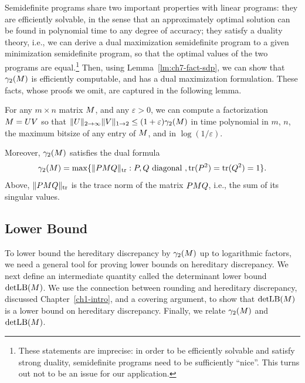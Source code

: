 Semidefinite programs share two important properties with linear
programs: they are efficiently solvable, in the sense that an
approximately optimal solution can be found in polynomial time to any
degree of accuracy; they satisfy a duality theory, i.e., we can 
derive a dual maximization semidefinite program to a given
minimization semidefinite program, so that the optimal values of the
two programs are equal.\footnote{These statements are imprecise: in
  order to be efficiently solvable and satisfy strong duality,
  semidefinite programs need to be sufficiently ``nice''. This turns
  out not to be an issue for our application.} Then, using
Lemma~\ref{lm:ch7-fact-sdp}, we can show that
$\gamma_2(M)$ is efficiently computable, and has a dual
maximization formulation. These facts, whose proofs we omit, are
captured in the following lemma.


\begin{lemma}\label{lm:ch7-fact-dual}
  For any $m\times n$ matrix $M$, and any $\varepsilon > 0$, we can
  compute a factorization $M = UV$ so that $\|U\|_{2\to\infty}
  \|V\|_{1\to 2} \le (1+\varepsilon)\gamma_2(M)$ in time polynomial
  in $m$, $n$, the maximum bitsize of any entry of $M$, and in
  $\log(1/\varepsilon)$.

  Moreover, $\gamma_2(M)$ satisfies the dual formula
  \begin{equation}
    \label{eq:ch7-fact-dual}
    \gamma_2(M) =
    \max\{\|PM Q\|_{\operatorname{tr}}: P, Q \text{ diagonal }, \operatorname{tr}(P^2) = \operatorname{tr}(Q^2) = 1\}.
  \end{equation}
  Above, $\|PM Q\|_{\operatorname{tr}}$ is the trace norm of the matrix $PM Q$,
  i.e., the sum of its singular values. 
\end{lemma}

\subsection{Lower Bound}
To lower bound the hereditary discrepancy by $\gamma_2(M)$ up to logarithmic factors, we need a general tool for proving lower bounds on hereditary
discrepancy. 
We next define an intermediate quantity called the determinant lower bound $\operatorname{detLB}(M)$. We use the connection between rounding and hereditary discrepancy, discussed Chapter~\ref{ch1-intro}, and a covering argument, to show that $\operatorname{detLB}(M)$ is a lower bound on hereditary discrepancy. Finally, we relate  $\gamma_2(M)$ and $\operatorname{detLB}(M)$.

